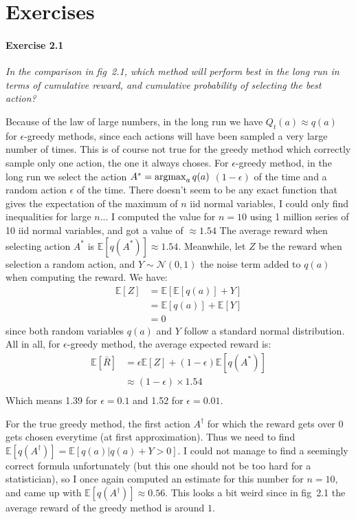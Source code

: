 \section{Exercises}

\paragraph{Exercise 2.1}
\textit{In the comparison in fig~2.1, which method will perform best in the long run in terms of cumulative reward, and cumulative probability of selecting the best action?}

Because of the law of large numbers, in the long run we have $Q_t(a) \approx q(a)$ for $\epsilon$-greedy methods, since each actions will have been sampled a very large number of times.
This is of course not true for the greedy method which correctly sample only one action, the one it always choses.
For $\epsilon$-greedy method, in the long run we select the action $A^* = \operatorname*{argmax}_a q(a)$ $(1 - \epsilon)$ of the time and a random action $\epsilon$ of the time.
There doesn't seem to be any exact function that gives the expectation of the maximum of $n$ iid normal variables, I could only find inequalities for large $n$...
I computed the value for $n = 10$ using 1 million series of 10 iid normal variables, and got a value of $\approx 1.54$
The average reward when selecting action $A^*$ is $\mathbb{E}[q(A^*)] \approx 1.54$.
Meanwhile, let $Z$ be the reward when selection a random action, and $Y \sim \mathcal{N}(0,1)$ the noise term added to $q(a)$ when computing the reward.
We have:
\begin{align*}
\mathbb{E}[Z] &= \mathbb{E}[\mathbb{E}[q(a)] + Y] \\
              &= \mathbb{E}[q(a)] + \mathbb{E}[Y] \\
              &= 0
\end{align*}
since both random variables $q(a)$ and $Y$ follow a standard normal distribution.
All in all, for $\epsilon$-greedy method, the average expected reward is:
\begin{align*}
\mathbb{E}[\bar{R}] &= \epsilon \mathbb{E}[Z] + (1 - \epsilon) \mathbb{E}[q(A^*)] \\
                    &\approx (1 - \epsilon) \times 1.54 \\
\end{align*}
Which means 1.39 for $\epsilon = 0.1$ and 1.52 for $\epsilon = 0.01$.

For the true greedy method, the first action $A^\dagger$ for which the reward gets over 0 gets chosen everytime (at first approximation).
Thus we need to find $\mathbb{E}[q(A^\dagger)] = \mathbb{E}[q(a)| q(a) + Y > 0]$.
I could not manage to find a seemingly correct formula unfortunately (but this one should not be too hard for a statistician), so I once again computed an estimate for this number for $n = 10$, and came up with $\mathbb{E}[q(A^\dagger)] \approx 0.56$.
This looks a bit weird since in fig~2.1 the average reward of the greedy method is around $1$.

